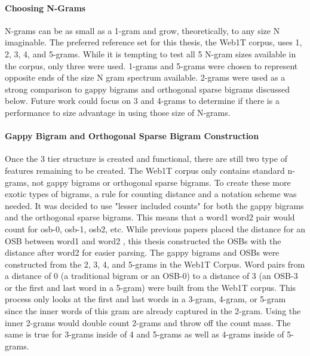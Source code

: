 		\paragraph{Choosing N-Grams} N-grams can be as small as a 1-gram and grow, theoretically, to any size N imaginable.  The preferred reference set for this thesis, the Web1T corpus, uses 1, 2, 3, 4, and 5-grams.  While it is tempting to test all 5 N-gram sizes available in the corpus, only three were used.  1-grams and 5-grams were chosen to represent opposite ends of the size N gram spectrum available.  2-grams were used as a strong comparison to gappy bigrams and orthogonal sparse bigrams discussed below.  Future work could focus on 3 and 4-grams to determine if there is a performance to size advantage in using those size of N-grams.
		
		\paragraph{Gappy Bigram and Orthogonal Sparse Bigram Construction} Once the 3 tier structure is created and functional, there are still two type of features remaining to be created.  The Web1T corpus only contains standard n-grams, not gappy bigrams or orthogonal sparse bigrams.  To create these more exotic types of bigrams, a rule for counting distance and a notation scheme was needed.  It was decided to use "lesser included counts" for both the gappy bigrams and the orthogonal sparse bigrams.  This means that a word1 word2 pair would count for osb-0, osb-1, osb2, etc.  While previous papers placed the distance for an OSB between word1 and word2 \cite{bikel_if_2007}, this thesis constructed the OSBs with the distance after word2 for easier parsing.  The gappy bigrams and OSBs were constructed from the 2, 3, 4, and 5-grams in the Web1T Corpus.  Word pairs from a distance of 0 (a traditional bigram or an OSB-0) to a distance of 3 (an OSB-3 or the first and last word in a 5-gram) were built from the Web1T corpus.  This process only looks at the first and last words in a 3-gram, 4-gram, or 5-gram since the inner words of this gram are already captured in the 2-gram.  Using the inner 2-grams would double count 2-grams and throw off the count mass.  The same is true for 3-grams inside of 4 and 5-grams as well as 4-grams inside of 5-grams.
	
